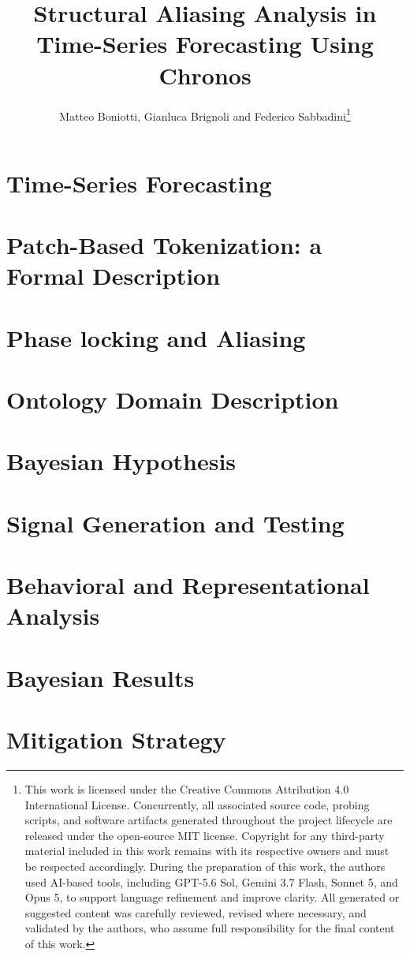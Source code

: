 \documentclass[
	letterpaper, %
	10pt, %
	unnumberedsections, %
	twoside, %
]{LTJournalArticle}
\title{Structural Aliasing Analysis in Time-Series Forecasting Using Chronos} %
\author{
	Matteo Boniotti, Gianluca Brignoli and Federico Sabbadini\thanks{This work is licensed under the Creative Commons Attribution 4.0 International License. Concurrently, all associated source code, probing scripts, and software artifacts generated throughout the project lifecycle are released under the open-source MIT license. \newline Copyright for any third-party material included in this work remains with its respective owners and must be respected accordingly. \newline \newline During the preparation of this work, the authors used AI-based tools, including GPT-5.6 Sol, Gemini 3.7 Flash, Sonnet 5, and Opus 5, to support language refinement and improve clarity. All generated or suggested content was carefully reviewed, revised where necessary, and validated by the authors, who assume full responsibility for the final content of this work.}
}
\begin{document}
\maketitle

\section{Time-Series Forecasting} \label{sec:introduction}


\section{Patch-Based Tokenization: a Formal Description} \label{sec:one}


\section{Phase locking and Aliasing} \label{sec:two}


\section{Ontology Domain Description} \label{sec:three}


\section{Bayesian Hypothesis} \label{sec:four}


\section{Signal Generation and Testing} \label{sec:five}


\section{Behavioral and Representational Analysis} \label{sec:six}


\section{Bayesian Results} \label{sec:seven}


\section{Mitigation Strategy} \label{sec:eight}

\end{document}
